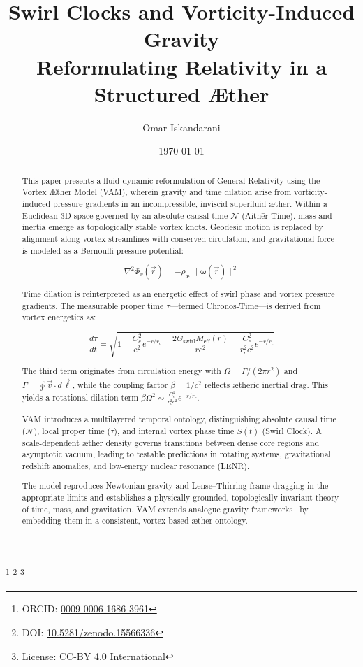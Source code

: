\documentclass[preprint]{revtex4-2}
\newcommand{\paperdoi}{10.5281/zenodo.15566336}
\begin{document}
\title{Swirl Clocks and Vorticity-Induced Gravity\\[0.25em]
\large Reformulating Relativity in a Structured Æther}

\author{Omar Iskandarani}
\thanks{ORCID: \href{https://orcid.org/0009-0006-1686-3961}{0009-0006-1686-3961}}
\thanks{DOI: \href{https://doi.org/\paperdoi}{\paperdoi}}
\thanks{License: CC-BY 4.0 International}

\date{\today}


    \begin{abstract}
        This paper presents a fluid-dynamic reformulation of General Relativity using the Vortex Æther Model (VAM), wherein gravity and time dilation arise from vorticity-induced pressure gradients in an incompressible, inviscid superfluid æther. Within a Euclidean 3D space governed by an absolute causal time $\mathcal{N}$ (Aithēr-Time), mass and inertia emerge as topologically stable vortex knots. Geodesic motion is replaced by alignment along vortex streamlines with conserved circulation, and gravitational force is modeled as a Bernoulli pressure potential:

        \[
        \nabla^2 \Phi_v(\vec{r}) = -\rho_\text{\ae} \, \|\boldsymbol{\omega}(\vec{r})\|^2
        \]

        Time dilation is reinterpreted as an energetic effect of swirl phase and vortex pressure gradients. The measurable proper time $\tau$—termed Chronos-Time—is derived from vortex energetics as:

        \[
        \frac{d\tau}{dt} = \sqrt{
        1 - \frac{C_e^2}{c^2} e^{-r/r_c}
        - \frac{2 G_\text{swirl} M_\text{eff}(r)}{r c^2}
        - \frac{C_e^2}{r_c^2 c^2} e^{-r/r_c}
        }
        \]

        The third term originates from circulation energy with $\Omega = \Gamma / (2\pi r^2)$ and $\Gamma = \oint \vec{v} \cdot d\vec{\ell}$, while the coupling factor $\beta = 1/c^2$ reflects ætheric inertial drag. This yields a rotational dilation term $\beta \Omega^2 \sim \frac{C_e^2}{r_c^2 c^2} e^{-r/r_c}$.

        VAM introduces a multilayered temporal ontology, distinguishing absolute causal time ($\mathcal{N}$), local proper time ($\tau$), and internal vortex phase time $S(t)$ (Swirl Clock). A scale-dependent æther density governs transitions between dense core regions and asymptotic vacuum, leading to testable predictions in rotating systems, gravitational redshift anomalies, and low-energy nuclear resonance (LENR).

        The model reproduces Newtonian gravity and Lense–Thirring frame-dragging in the appropriate limits and establishes a physically grounded, topologically invariant theory of time, mass, and gravitation. VAM extends analogue gravity frameworks~\cite{barcelo2011analogue, volovik2009universe} by embedding them in a consistent, vortex-based æther ontology.
    \end{abstract}
    \maketitle
    \vfill
\end{document}
